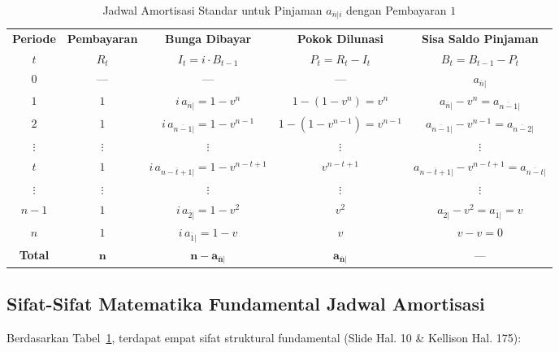 \documentclass[11pt,a4paper]{article}
\begin{document}
\begin{table}[htbp]
\centering
\small
\setlength{\tabcolsep}{5pt}
\caption{Jadwal Amortisasi Standar untuk Pinjaman $a_{\overline{n}|i}$ dengan Pembayaran $1$}
\label{tab:amort_unit}
\vspace{0.5em}
\begin{tabular}{ccccc}
\toprule
\textbf{Periode} & \textbf{Pembayaran} & \textbf{Bunga Dibayar} & \textbf{Pokok Dilunasi} & \textbf{Sisa Saldo Pinjaman} \\
$t$ & $R_t$ & $I_t = i \cdot B_{t-1}$ & $P_t = R_t - I_t$ & $B_t = B_{t-1} - P_t$ \\
\midrule
$0$ & --- & --- & --- & $a_{\overline{n}|}$ \\
$1$ & $1$ & $i \, a_{\overline{n}|} = 1 - v^n$ & $1 - (1 - v^n) = v^n$ & $a_{\overline{n}|} - v^n = a_{\overline{n-1}|}$ \\
$2$ & $1$ & $i \, a_{\overline{n-1}|} = 1 - v^{n-1}$ & $1 - (1 - v^{n-1}) = v^{n-1}$ & $a_{\overline{n-1}|} - v^{n-1} = a_{\overline{n-2}|}$ \\
$\vdots$ & $\vdots$ & $\vdots$ & $\vdots$ & $\vdots$ \\
$t$ & $1$ & $i \, a_{\overline{n-t+1}|} = 1 - v^{n-t+1}$ & $v^{n-t+1}$ & $a_{\overline{n-t+1}|} - v^{n-t+1} = a_{\overline{n-t}|}$ \\
$\vdots$ & $\vdots$ & $\vdots$ & $\vdots$ & $\vdots$ \\
$n-1$ & $1$ & $i \, a_{\overline{2}|} = 1 - v^2$ & $v^2$ & $a_{\overline{2}|} - v^2 = a_{\overline{1}|} = v$ \\
$n$ & $1$ & $i \, a_{\overline{1}|} = 1 - v$ & $v$ & $v - v = 0$ \\
\midrule
\textbf{Total} & $\mathbf{n}$ & $\mathbf{n - a_{\overline{n}|}}$ & $\mathbf{a_{\overline{n}|}}$ & --- \\
\bottomrule
\end{tabular}
\end{table}

\subsection{Sifat-Sifat Matematika Fundamental Jadwal Amortisasi}

Berdasarkan Tabel~\ref{tab:amort_unit}, terdapat empat sifat struktural fundamental (Slide Hal. 10 \& Kellison Hal. 175):
\end{document}
